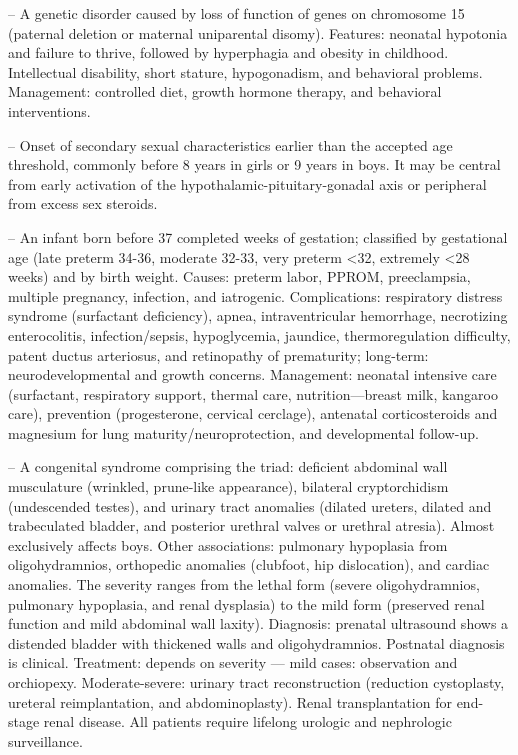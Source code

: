 -- A genetic disorder caused by loss of function of genes on chromosome 15 (paternal deletion or maternal uniparental disomy). Features: neonatal hypotonia and failure to thrive, followed by hyperphagia and obesity in childhood. Intellectual disability, short stature, hypogonadism, and behavioral problems. Management: controlled diet, growth hormone therapy, and behavioral interventions.

-- Onset of secondary sexual characteristics earlier than the accepted age threshold, commonly before 8 years in girls or 9 years in boys. It may be central from early activation of the hypothalamic-pituitary-gonadal axis or peripheral from excess sex steroids.

-- An infant born before 37 completed weeks of gestation; classified by gestational age (late preterm 34-36, moderate 32-33, very preterm <32, extremely <28 weeks) and by birth weight. Causes: preterm labor, PPROM, preeclampsia, multiple pregnancy, infection, and iatrogenic. Complications: respiratory distress syndrome (surfactant deficiency), apnea, intraventricular hemorrhage, necrotizing enterocolitis, infection/sepsis, hypoglycemia, jaundice, thermoregulation difficulty, patent ductus arteriosus, and retinopathy of prematurity; long-term: neurodevelopmental and growth concerns. Management: neonatal intensive care (surfactant, respiratory support, thermal care, nutrition—breast milk, kangaroo care), prevention (progesterone, cervical cerclage), antenatal corticosteroids and magnesium for lung maturity/neuroprotection, and developmental follow-up.

-- A congenital syndrome comprising the triad: deficient abdominal wall musculature (wrinkled, prune-like appearance), bilateral cryptorchidism (undescended testes), and urinary tract anomalies (dilated ureters, dilated and trabeculated bladder, and posterior urethral valves or urethral atresia). Almost exclusively affects boys. Other associations: pulmonary hypoplasia from oligohydramnios, orthopedic anomalies (clubfoot, hip dislocation), and cardiac anomalies. The severity ranges from the lethal form (severe oligohydramnios, pulmonary hypoplasia, and renal dysplasia) to the mild form (preserved renal function and mild abdominal wall laxity). Diagnosis: prenatal ultrasound shows a distended bladder with thickened walls and oligohydramnios. Postnatal diagnosis is clinical. Treatment: depends on severity — mild cases: observation and orchiopexy. Moderate-severe: urinary tract reconstruction (reduction cystoplasty, ureteral reimplantation, and abdominoplasty). Renal transplantation for end-stage renal disease. All patients require lifelong urologic and nephrologic surveillance.

